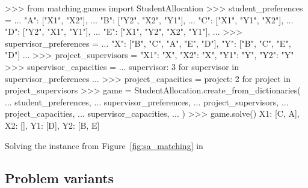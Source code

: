\begin{listing}[htbp]
\begin{usagepy}
>>> from matching.games import StudentAllocation
>>> student_preferences = {
...     "A": ["X1", "X2"],
...     "B": ["Y2", "X2", "Y1"],
...     "C": ["X1", "Y1", "X2"],
...     "D": ["Y2", "X1", "Y1"],
...     "E": ["X1", "Y2", "X2", "Y1"],
... }
>>> supervisor_preferences = {
...     "X": ["B", "C", "A", "E", "D"], "Y": ["B", "C", "E", "D"]
... }
>>> project_supervisors = {"X1": "X", "X2": "X", "Y1": "Y", "Y2": "Y"}
>>> supervisor_capacities = {
...     supervisor: 3 for supervisor in supervisor_preferences
... }
>>> project_capacities = {project: 2 for project in project_supervisors}
>>> game = StudentAllocation.create_from_dictionaries(
...     student_preferences,
...     supervisor_preferences,
...     project_supervisors,
...     project_capacities,
...     supervisor_capacities,
... )
>>> game.solve()
{X1: [C, A], X2: [], Y1: [D], Y2: [B, E]}

\end{usagepy}
\caption{Solving the instance from Figure~\ref{fig:sa_matching} in \matching}
\label{snp:student_optimal}
\end{listing}


\subsection{Problem variants}
